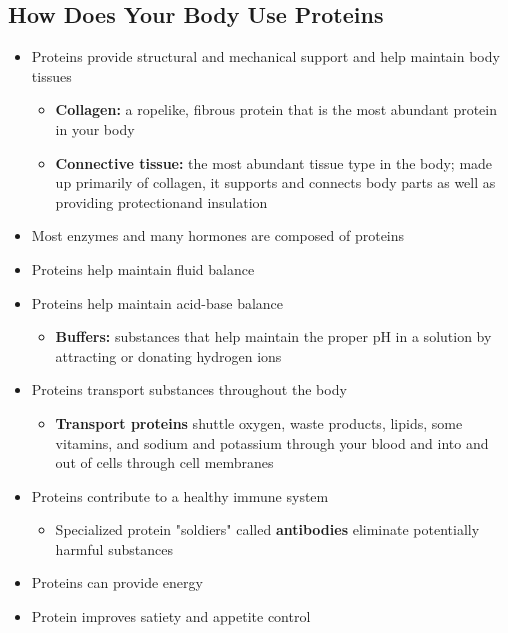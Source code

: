 \documentclass[12pt]{article}
\begin{document}
        \subsection{How Does Your Body Use Proteins}
            \begin{itemize}
                \item Proteins provide structural and mechanical support and help maintain body tissues
                    \begin{itemize}
                        \item \textbf{Collagen:} a ropelike, fibrous protein that is the most abundant protein in your body
                        \item \textbf{Connective tissue:} the most abundant tissue type in the body; made up primarily of collagen, it supports and connects body parts as well as providing protectionand insulation
                    \end{itemize}
                \item Most enzymes and many hormones are composed of proteins
                \item Proteins help maintain fluid balance
                \item Proteins help maintain acid-base balance
                    \begin{itemize}
                        \item \textbf{Buffers:} substances that help maintain the proper pH in a solution by attracting or donating hydrogen ions
                    \end{itemize}
                \item Proteins transport substances throughout the body
                    \begin{itemize}
                        \item \textbf{Transport proteins} shuttle oxygen, waste products, lipids, some vitamins, and sodium and potassium through your blood and into and out of cells through cell membranes
                    \end{itemize}
                \item Proteins contribute to a healthy immune system
                    \begin{itemize}
                        \item Specialized protein "soldiers" called \textbf{antibodies} eliminate potentially harmful substances
                    \end{itemize}
                \item Proteins can provide energy
                \item Protein improves satiety and appetite control
            \end{itemize}
\end{document}
